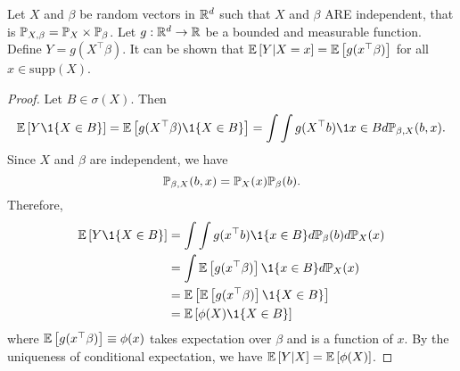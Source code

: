 \begin{exercise}
    Let $X$ and $\beta$ be random vectors in $\mathbb{R}^d$ such that $X$ and $\beta$ ARE independent, that is $\mathbb{P}_{X,\beta}=\mathbb{P}_X \times \mathbb{P}_\beta$. Let $g:\mathbb{R}^d\to\mathbb{R}$ be a bounded and measurable function. Define $Y=g(X^\top\beta)$. It can be shown that $\mathbb{E}\left[Y|X=x\right]=\mathbb{E}\left[g(x^\top\beta)\right]$ for all $x\in \text{supp}(X)$.
\end{exercise}
\begin{proof}
    Let $B\in \sigma(X)$. Then $$\E\bra{Y\1\{X\in B\}}=\E\bra{g(X^\top\beta)\1\{X\in B\}}=\int\int g(X^\top b)\1{x\in B}d\p_{\beta,X}(b,x).$$ 
    Since $X$ and $\beta$ are independent, we have $$\mathbb{P}_{\beta,X}(b,x)=\mathbb{P}_X(x)\mathbb{P}_\beta(b).$$
    Therefore, \begin{equation*}
        \begin{split}
            \E\bra{Y\1\{X\in B\}}&=\int\int g(x^\top b)\1\{x\in B\}d\p_{\beta}(b)d\p_X(x) \\&=\int \E\bra{g(x^\top \beta)}\1\{x\in B\}d\p_X(x)\\
            &=\E\bra{\E\bra{g(x^\top \beta)}\1\{X\in B\}}\\
            &=\E\bra{\phi(X)\1\{X\in B\}}
        \end{split}
    \end{equation*}
    where $ \mathbb{E}\left[g(x^\top \beta)\right]\equiv \phi(x)$ takes expectation over $\beta$ and is a function of $x$.
    By the uniqueness of conditional expectation, we have $\mathbb{E}\left[Y|X\right]=\mathbb{E}\left[\phi(X)\right]$.
\end{proof}
